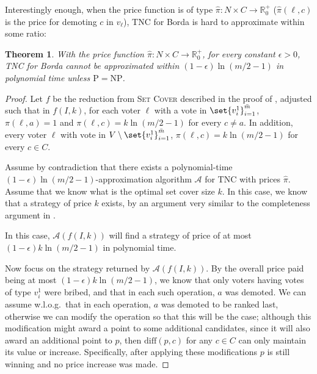 \documentclass[letterpaper]{article} %
\newtheorem{theorem}{Theorem}
\newcommand{\preals}{\mathbb{R}^{+}_{0}}
\newcommand{\SC}{\textsc{Set Cover}}
\newcommand{\SB}{\textsc{TNC}}
\newcommand{\abs}[1]{\lvert{#1}\rvert}
\newcommand{\diff}{\mathrm{diff}}
\newcommand{\NP}{\mathrm{NP}}
\newcommand{\Pclass}{\mathrm{P}}
\begin{document}
Interestingly enough, when the price function is of type $\hat{\pi}\colon N \times C \to \preals$  ($\hat{\pi}(\ell,c)$ is the price for demoting $c$ in $v_\ell$), \SB{} for Borda is hard to approximate within some ratio: 
\begin{theorem}
With the price function $\hat{\pi}\colon N \times C \to \preals$, for every constant $\epsilon >0$, \SB{} for Borda cannot be approximated within $(1-\epsilon) \ln (m/2-1)$ in polynomial time unless $\Pclass = \NP$. 
\end{theorem}
\begin{proof}
Let $f$ be the reduction from \SC{} described in the proof of  , adjusted such that in $f(I,k)$,  for each voter $\ell$ with a vote in $\set{v_i^1}_{i=1}^{\bar{m}}$,  $\pi(\ell,a) = 1$ and $\pi(\ell,c) = k\ln (m/2-1)$ for every $c \neq a$. In addition, every voter $\ell$ with vote in $V \setminus \set{v_i^1}_{i=1}^{\bar{m}}$,  $\pi(\ell,c) = k\ln (m/2-1)$ for every $c \in C$.

Assume by contradiction that there exists a polynomial-time $(1-\epsilon) \ln (m/2-1)$-approximation algorithm $\mathcal{A}$ for \SB{} with prices $\hat{\pi}$.  
Assume that we know what is the optimal set cover size $k$.
In this case, we know that a strategy of price $k$ exists, by an argument very similar to the completeness argument in . %

In this case, $\mathcal{A}(f(I,k))$ will find a strategy of price of at most $(1-\epsilon) k \ln (m/2-1)$ in polynomial time.

Now focus on the strategy returned by $\mathcal{A}(f(I,k))$. By the overall price paid being at most  $ (1-\epsilon) k\ln (m/2-1)$, we know that only voters having votes of type $v_i^1$ were bribed, and that in each such operation, $a$ was demoted. We can assume w.l.o.g.\ that in each operation, $a$ was demoted  to be ranked last, otherwise we can modify the operation so that this will be the case; although this modification might award a point to some additional candidates, since it will also award an additional point to $p$, then $\diff(p,c)$ for any $c \in C$ can only maintain its value or increase. Specifically, after applying these modifications $p$ is still winning and no price increase was made. 


\end{proof}
\end{document}
